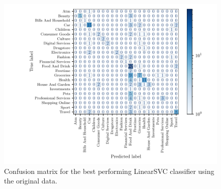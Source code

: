 \begin{figure}[ht]
  \centering
  \includegraphics[width=\textwidth]{../img/plot_cm_LinearSVC_original}
  \caption{Confusion matrix for the best performing LinearSVC classifier using the original data.}
  \label{fig:confusion_matrix}
\end{figure}


